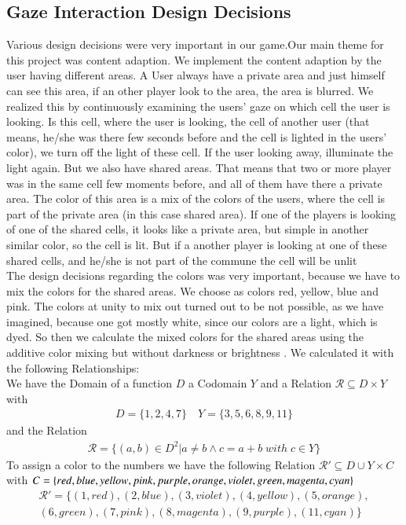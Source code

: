\documentclass{sigchi}
\begin{document}
\subsection{Gaze Interaction Design Decisions}
Various design decisions were very important in our game.Our main theme for this project was content adaption. We implement the content adaption by the user having different areas. A User always have a private area and just himself can see this area, if an other player look to the area, the area is blurred. We realized this by continuously examining the users' gaze on which cell the user is looking. Is this cell, where the user is looking, the cell of another user (that means, he/she was there few seconds before and the cell is lighted in the users' color), we turn off the light of these cell. If the user looking away, illuminate the light again. But we also have shared areas. That means that two or more player was in the same cell few moments before, and all of them have there a private area. The color of this area is a mix of the colors of the users, where the cell is part of the private area (in this case shared area). If one of the players is looking of one of the shared cells, it looks like a private area, but simple in another similar color, so the cell is lit. But if a another player is looking at one of these shared cells, and he/she is not part of the commune the cell will be unlit\\ 
The design decisions regarding the colors was very important, because we have to mix the colors for the shared areas. We choose as colors red, yellow, blue and pink. The colors at unity to mix out turned out to be not possible, as we have imagined, because one got mostly white, since our colors are a light, which is dyed. So then we calculate the mixed colors for the shared areas using the additive color mixing but without darkness or brightness . We calculated it with the following Relationships: \\
We have the Domain of a function $D$ a Codomain $Y$ and a Relation $\mathcal{R} \subseteq D \times Y$ with 
\begin{align*} D = \{1,2,4,7\}   \quad Y = \{3,5,6,8,9,11\} \end{align*} and the Relation \begin{align*} \mathcal{R} = \{(a,b) \in  D^2 | a \neq b \wedge c=a+b \; with\; c \in Y \} \end{align*}
To assign a color to the numbers we have the following Relation $\mathcal{R}' \subseteq D \cup Y \times C$ with $ C= \{red, blue, yellow, pink, purple, orange, violet, green, \\magenta, cyan\} $
\begin{align*} \mathcal{R}' = \{(1,red),(2,blue),(3,violet), (4,yellow), (5,orange), \\ (6,green), (7,pink), (8,magenta), (9,purple), (11,cyan)\} \end{align*}
\end{document}
